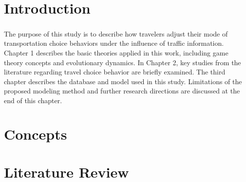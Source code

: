 \documentclass[12pt]{report}
\begin{document}
\thispagestyle{empty}
\thispagestyle{empty}
\chapter*{Introduction}
\paragraph{}The purpose of this study is to describe how travelers adjust their mode of transportation choice behaviors under the influence of traffic information. Chapter 1 describes the basic theories applied in this work, including game theory concepts and evolutionary dynamics. In Chapter 2, key studies from the literature regarding travel choice behavior are briefly examined. The third chapter describes the database and model used in this study. Limitations of the proposed modeling method and further research directions are discussed at the end of this chapter. 

\chapter{Concepts}\setcounter{page}{1}\thispagestyle{empty}


\chapter{Literature Review} 

\end{document}
